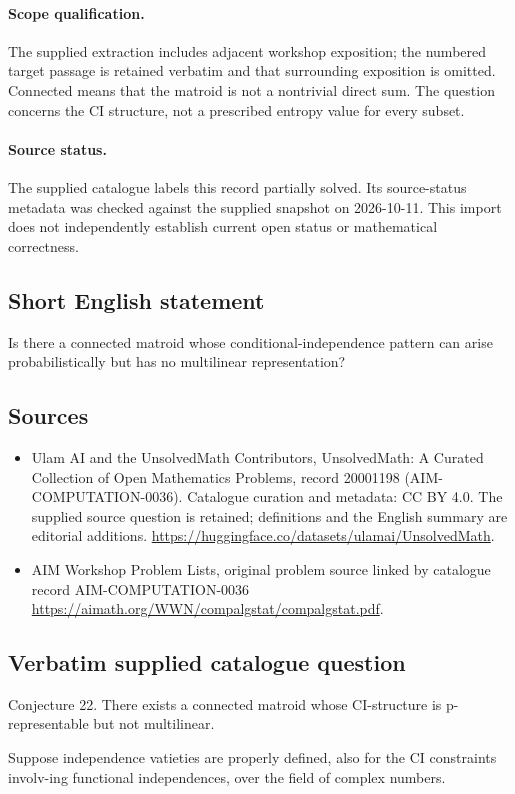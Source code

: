 \documentclass[11pt]{article}
\begin{document}
\paragraph{Scope qualification.}
The supplied extraction includes adjacent workshop exposition; the numbered target passage is retained verbatim and that surrounding exposition is omitted. Connected means that the matroid is not a nontrivial direct sum. The question concerns the CI structure, not a prescribed entropy value for every subset.
\paragraph{Source status.}
The supplied catalogue labels this record partially solved. Its source-status metadata was checked against the supplied snapshot on 2026-10-11. This import does not independently establish current open status or mathematical correctness.
\subsection{Short English statement}
Is there a connected matroid whose conditional-independence pattern can arise probabilistically but has no multilinear representation?
\subsection{Sources}
\begin{itemize}
\item[S1] Ulam AI and the UnsolvedMath Contributors, UnsolvedMath: A Curated Collection of Open Mathematics Problems, record 20001198 (AIM-COMPUTATION-0036). Catalogue curation and metadata: CC BY 4.0. The supplied source question is retained; definitions and the English summary are editorial additions.
\url{https://huggingface.co/datasets/ulamai/UnsolvedMath}.
\item[S2] AIM Workshop Problem Lists, original problem source linked by catalogue record AIM-COMPUTATION-0036
\url{https://aimath.org/WWN/compalgstat/compalgstat.pdf}.
\end{itemize}
\subsection{Verbatim supplied catalogue question}
Conjecture 22. There exists a connected matroid whose CI-structure is p-representable but not multilinear.

Suppose independence vatieties are properly defined, also for the CI constraints involv-ing functional independences, over the field of complex numbers.
\end{document}
